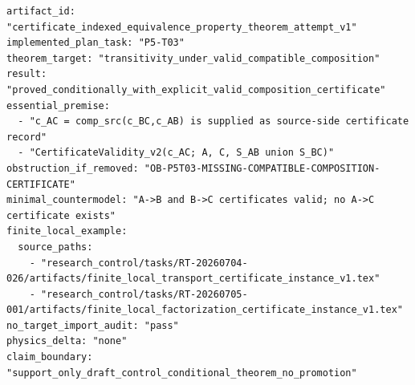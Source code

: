 \documentclass[11pt]{article}
\begin{document}
\begin{verbatim}
artifact_id: "certificate_indexed_equivalence_property_theorem_attempt_v1"
implemented_plan_task: "P5-T03"
theorem_target: "transitivity_under_valid_compatible_composition"
result: "proved_conditionally_with_explicit_valid_composition_certificate"
essential_premise:
  - "c_AC = comp_src(c_BC,c_AB) is supplied as source-side certificate record"
  - "CertificateValidity_v2(c_AC; A, C, S_AB union S_BC)"
obstruction_if_removed: "OB-P5T03-MISSING-COMPATIBLE-COMPOSITION-CERTIFICATE"
minimal_countermodel: "A->B and B->C certificates valid; no A->C certificate exists"
finite_local_example:
  source_paths:
    - "research_control/tasks/RT-20260704-026/artifacts/finite_local_transport_certificate_instance_v1.tex"
    - "research_control/tasks/RT-20260705-001/artifacts/finite_local_factorization_certificate_instance_v1.tex"
no_target_import_audit: "pass"
physics_delta: "none"
claim_boundary: "support_only_draft_control_conditional_theorem_no_promotion"
\end{verbatim}
\end{document}
